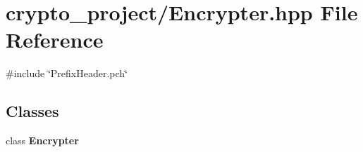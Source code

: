 \section{crypto\+\_\+project/\+Encrypter.hpp File Reference}
\label{_encrypter_8hpp}
{\ttfamily \#include \char`\"{}Prefix\+Header.\+pch\char`\"{}}\newline
\subsection*{Classes}
\begin{DoxyCompactItemize}
\item 
class \textbf{ Encrypter}
\end{DoxyCompactItemize}

